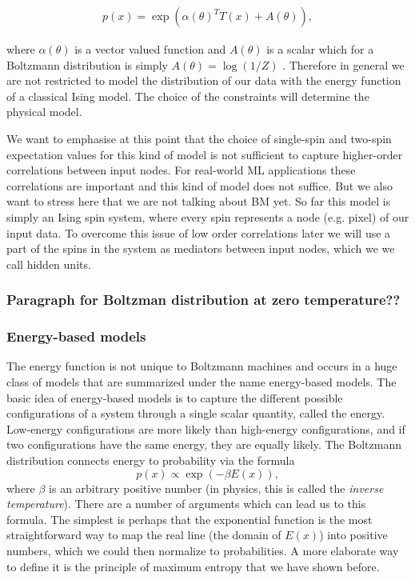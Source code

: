 \documentclass[nofootinbib, superscriptaddress, prl]{revtex4}
\begin{document}
\begin{align}
	p(x) = \exp \left( \alpha(\theta)^T T(x) + A(\theta) \right),
\end{align}

where $\alpha(\theta)$ is a vector valued function and $A(\theta)$ is a scalar which for a Boltzmann distribution is simply $A(\theta) = \log(1/Z)$ \cite{li_learning_2013}. Therefore in general we are not restricted to model the distribution of our data with the energy function of a classical Ising model. The choice of the constraints will determine the physical model.


We want to emphasise at this point that the choice of single-spin and two-spin expectation values for this kind of model is not sufficient to capture higher-order correlations between input nodes. For real-world ML applications these correlations are important and this kind of model does not suffice. But we also want to stress here that we are not talking about BM yet. So far this model is simply an Ising spin system, where every spin represents a node (e.g. pixel) of our input data. To overcome this issue of low order correlations later we will use a part of the spins in the system as mediators between input nodes, which we we call hidden units.

\subsubsection{Paragraph for Boltzman distribution at zero temperature??}

\subsubsection{Energy-based models}

The energy function is not unique to Boltzmann machines and occurs in a huge class of models that are summarized under the name energy-based models. The basic idea of energy-based models is to capture the different possible configurations of a system through a single scalar quantity, called the energy. Low-energy configurations are more likely than high-energy configurations, and if two configurations have the same energy, they are equally likely. The Boltzmann distribution connects energy to probability via the formula
\begin{equation}
 p(x) \propto \exp(-\beta E(x)),
\end{equation}
where $\beta$ is an arbitrary positive number (in physics, this is called the \emph{inverse temperature}). 
There are a number of arguments which can lead us to this formula. The simplest is perhaps that the exponential function is the most straightforward way to map the real line (the domain of $E(x)$) into positive numbers, which we could then normalize to probabilities. A more elaborate way to define it is the principle of maximum entropy that we have shown before.
\end{document}
